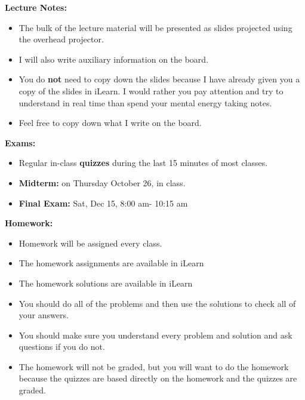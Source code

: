 \documentclass[oneside,12pt]{amsart}
\begin{document}
\bigskip

\textbf{Lecture Notes:}
\begin{itemize}
\item The bulk of the lecture material will be presented as slides projected using the overhead projector.
\item I will also write auxiliary information on the board.
\item You do \textbf{not} need to copy down the slides because I have already given you a copy of the slides in iLearn. I would rather you pay attention
and try to understand in real time than spend your mental energy taking notes.
\item Feel free to copy down what I write on the board.
\end{itemize}

\bigskip

\textbf{Exams:}
\begin{itemize}
\item Regular in-class \textbf{quizzes} during the last 15 minutes of most classes.
\item \textbf{Midterm:} on Thursday October 26, in class.
\item \textbf{Final Exam:} Sat, Dec 15, 8:00 am- 10:15 am
\end{itemize}

\bigskip

\textbf{Homework:}
\begin{itemize}
\item Homework will be assigned every class.
\item The homework assignments are available in iLearn
\item The homework solutions are available in iLearn
\item You should do all of the problems and then use the solutions to check all of your answers.
\item You should make sure you understand every problem and solution and ask questions if you do not.
\item The homework will not be graded, but you will want to do the homework because the quizzes are based directly on the homework and the quizzes are graded.
\end{itemize}

\bigskip
\end{document}
